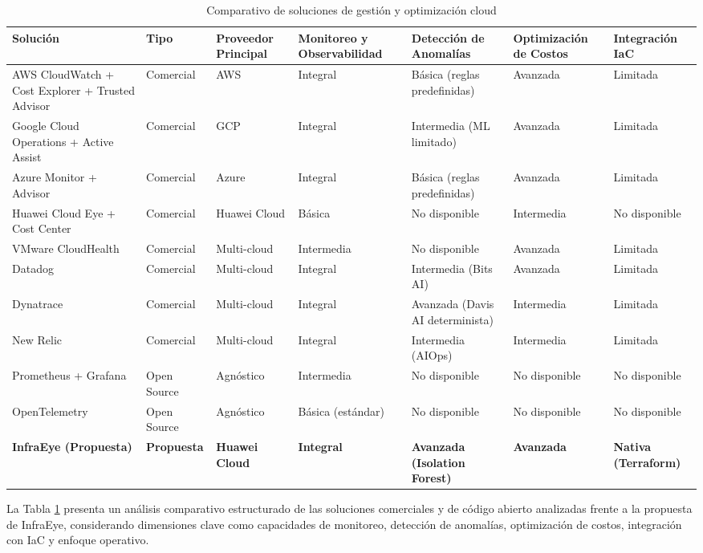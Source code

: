 \begin{table}[H]
\centering
\scriptsize
\begin{tabular}{|p{2.5cm}|p{1.5cm}|p{2cm}|p{2cm}|p{2cm}|p{2cm}|p{2cm}|}
\hline
\textbf{Solución} & \textbf{Tipo} & \textbf{Proveedor Principal} & \textbf{Monitoreo y Observabilidad} & \textbf{Detección de Anomalías} & \textbf{Optimización de Costos} & \textbf{Integración IaC} \\
\hline
AWS CloudWatch + Cost Explorer + Trusted Advisor & Comercial & AWS & Integral & Básica (reglas predefinidas) & Avanzada & Limitada \\
\hline
Google Cloud Operations + Active Assist & Comercial & GCP & Integral & Intermedia (ML limitado) & Avanzada & Limitada \\
\hline
Azure Monitor + Advisor & Comercial & Azure & Integral & Básica (reglas predefinidas) & Avanzada & Limitada \\
\hline
Huawei Cloud Eye + Cost Center & Comercial & Huawei Cloud & Básica & No disponible & Intermedia & No disponible \\
\hline
VMware CloudHealth & Comercial & Multi-cloud & Intermedia & No disponible & Avanzada & Limitada \\
\hline
Datadog & Comercial & Multi-cloud & Integral & Intermedia (Bits AI) & Avanzada & Limitada \\
\hline
Dynatrace & Comercial & Multi-cloud & Integral & Avanzada (Davis AI determinista) & Intermedia & Limitada \\
\hline
New Relic & Comercial & Multi-cloud & Integral & Intermedia (AIOps) & Intermedia & Limitada \\
\hline
Prometheus + Grafana & Open Source & Agnóstico & Intermedia & No disponible & No disponible & No disponible \\
\hline
OpenTelemetry & Open Source & Agnóstico & Básica (estándar) & No disponible & No disponible & No disponible \\
\hline
\textbf{InfraEye (Propuesta)} & \textbf{Propuesta} & \textbf{Huawei Cloud} & \textbf{Integral} & \textbf{Avanzada (Isolation Forest)} & \textbf{Avanzada} & \textbf{Nativa (Terraform)} \\
\hline
\end{tabular}
\caption{Comparativo de soluciones de gestión y optimización cloud}
\label{tab:comparativo}
\end{table}

La Tabla \ref{tab:comparativo} presenta un análisis comparativo estructurado de las soluciones comerciales y de código abierto analizadas frente a la propuesta de InfraEye, considerando dimensiones clave como capacidades de monitoreo, detección de anomalías, optimización de costos, integración con IaC y enfoque operativo.

